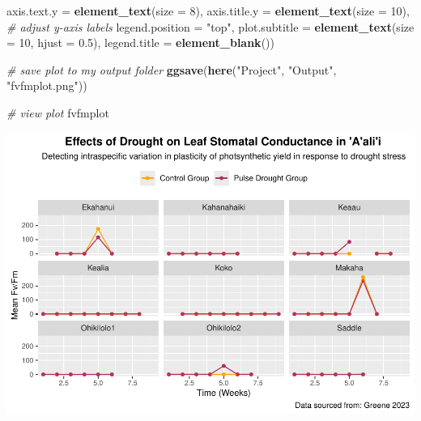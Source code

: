 \documentclass[
]{article}
\newenvironment{Shaded}{\begin{snugshade}}{\end{snugshade}}
\newcommand{\AttributeTok}[1]{\textcolor[rgb]{0.13,0.29,0.53}{#1}}
\newcommand{\CommentTok}[1]{\textcolor[rgb]{0.56,0.35,0.01}{\textit{#1}}}
\newcommand{\DecValTok}[1]{\textcolor[rgb]{0.00,0.00,0.81}{#1}}
\newcommand{\FloatTok}[1]{\textcolor[rgb]{0.00,0.00,0.81}{#1}}
\newcommand{\FunctionTok}[1]{\textcolor[rgb]{0.13,0.29,0.53}{\textbf{#1}}}
\newcommand{\NormalTok}[1]{#1}
\newcommand{\StringTok}[1]{\textcolor[rgb]{0.31,0.60,0.02}{#1}}
\begin{document}
\begin{Shaded}
\begin{Highlighting}[]
        \AttributeTok{axis.text.y =} \FunctionTok{element\_text}\NormalTok{(}\AttributeTok{size =} \DecValTok{8}\NormalTok{), }\AttributeTok{axis.title.y =} \FunctionTok{element\_text}\NormalTok{(}\AttributeTok{size =} \DecValTok{10}\NormalTok{),   }\CommentTok{\# adjust y{-}axis labels}
        \AttributeTok{legend.position =} \StringTok{"top"}\NormalTok{, }
        \AttributeTok{plot.subtitle =} \FunctionTok{element\_text}\NormalTok{(}\AttributeTok{size =} \DecValTok{10}\NormalTok{, }\AttributeTok{hjust =} \FloatTok{0.5}\NormalTok{), }
        \AttributeTok{legend.title =} \FunctionTok{element\_blank}\NormalTok{())}

\CommentTok{\# save plot to my output folder}
\FunctionTok{ggsave}\NormalTok{(}\FunctionTok{here}\NormalTok{(}\StringTok{"Project"}\NormalTok{, }\StringTok{"Output"}\NormalTok{, }\StringTok{"fvfmplot.png"}\NormalTok{)) }

\CommentTok{\# view plot}
\NormalTok{fvfmplot}
\end{Highlighting}
\end{Shaded}

\includegraphics{../Output/unnamed-chunk-3-1.pdf}
\end{document}
